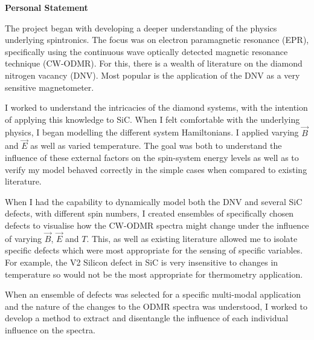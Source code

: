 \vspace*{\fill}
\begin{center}
\textrm{\bfseries\Huge Personal Statement}%
\end{center}%

\vspace{1em}

%
The project began with developing a deeper understanding of the physics underlying spintronics. 
The focus was on electron paramagnetic resonance (EPR), specifically using the continuous wave optically detected magnetic resonance technique (CW-ODMR). For this, there is a wealth of literature on the diamond nitrogen vacancy (DNV). Most popular is the application of the DNV as a very sensitive magnetometer. 

I worked to  understand the intricacies of the diamond systems, with the intention of applying this knowledge to SiC. 
When I felt comfortable with the underlying physics, I began modelling the different system Hamiltonians. I applied varying $\vec{B}$ and $\vec{E}$ as well as varied temperature. The goal was both to understand the influence of these external factors on the spin-system energy levels as well as to verify my model behaved correctly in the simple cases when compared to existing literature. 

When I had the capability to dynamically model both the DNV and several SiC defects, with different spin numbers, I created ensembles of specifically chosen defects to visualise how the CW-ODMR spectra might change under the influence of varying $\vec{B}$, $\vec{E}$ and $T$. This, as well as existing literature allowed me to isolate specific defects which were most appropriate for the sensing of specific variables. 
For example, the V2 Silicon defect in SiC is very insensitive to changes in temperature so would not be the most appropriate for thermometry application. 

When an ensemble of defects was selected for a specific multi-modal application and the nature of the changes to the ODMR spectra was understood, I worked to develop a method to extract and disentangle the influence of each individual influence on the spectra. 

